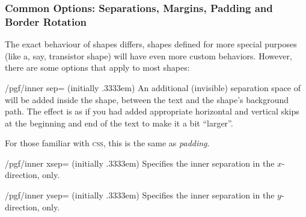 \subsubsection{Common Options: Separations, Margins, Padding and
               Border Rotation}
\label{section-shape-seps}
\label{section-shape-common-options}

The  exact behaviour of shapes
differs, shapes defined for more special purposes (like a, say, transistor
shape) will have even more custom behaviors. However, there are some options
that apply to most shapes:

\begin{key}{/pgf/inner sep= (initially .3333em)}
    An additional (invisible) separation space of  will be
    added inside the shape, between the text and the shape's background path.
    The effect is as if you had added appropriate horizontal and vertical skips
    at the beginning and end of the text to make it a bit ``larger''.

    For those familiar with \textsc{css}, this is the same as \emph{padding}.
\begin{codeexample}[]
\end{codeexample}
\end{key}

\begin{key}{/pgf/inner xsep= (initially .3333em)}
    Specifies the inner separation in the $x$-direction, only.
\end{key}

\begin{key}{/pgf/inner ysep= (initially .3333em)}
    Specifies the inner separation in the $y$-direction, only.
\end{key}

